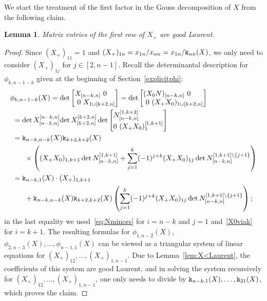 \documentclass{amsart}
\newtheorem{lemma}[theorem]{Lemma}
\theoremstyle{definition}
\theoremstyle{remark}
\numberwithin{equation}{section}
\numberwithin{theorem}{section}
\def\ek{{\tt k}}
\begin{document}
We start the treatment of the first factor in the Gauss decomposition of $X$ from the following claim.

\begin{lemma}
\label{lem:X+1Laurent}
Matrix entries of the first row of $X_+$ are  good Laurent.
\end{lemma}

\begin{proof} Since $(X_+)_{11}=1$ and $(X_+)_{1n}={x_{1n}}/{x_{nn}}={x_{1n}}/{\ek_{nn}(X)}$, we only need to consider 
$(X_+)_{1j}$ for $j\in[2, n-1]$. Recall the determinantal description for $\phi_{k,n-1-k}$ given 
at the beginning of Section~\ref{explicitphi}:
\begin{align*}
&\phi_{k,n-1-k}(X) =\det 
\begin{bmatrix*}[l]
X_{[n-k,n]}\ 0& \\
\ 0\ X_{1\cup [k+2,n]}\hspace{-1em}
\end{bmatrix*}
= \det 
\begin{bmatrix*}[l]
(X_0 N)_{[n-k,n]}\ 0& \\
\ 0\ (X_+X_0)_{1\cup [k+2,n]} \hspace{-1em}
\end{bmatrix*}\\
&\ = {\det X_{[n-k,n]}^{[n-k,n]} }{\det X_{[k+2,n]}^{[k+2,n]}} 
\det\begin{bmatrix*}[l]
N_{[n-k,n]}^{[1,k+2]} \\
0\ (X_+X_0)_{1}^{[1,k+1]}
\end{bmatrix*}\\
&\ ={\ek_{n-k,n-k}}(X){\ek_{k+2,k+2}}(X)\\
& \quad\quad\times \left (  (X_+X_0)_{1,k+1} \det N_{[n-k,n]}^{[1,k+1]} + \sum_{j=1}^k (-1)^{j+k}(X_+X_0)_{1j} \det N_{[n-k,n]}^{[1,k+1]\setminus \{j+1\}}\right )\\
&\ =\ek_{n-k,1}(X)\cdot(X_+)_{1,k+1}\\ &\quad\quad+{\ek_{n-k,n-k}}(X){\ek_{k+2,k+2}}(X)
  \left (\sum_{j=1}^k (-1)^{j+k}(X_+X_0)_{1j} \det N_{[n-k,n]}^{[1,k+1]\setminus \{j+1\}}\right );
\end{align*}
in the last equality we used~\eqref{eq:Nminors} for $i=n-k$ and $j=1$ and~\eqref{X0viak} for $i=k+1$. 
 The resulting formulas for $\phi_{1,n-2}(X)$, $\phi_{2,n-3}(X),\dots,\phi_{n-1,1}(X)$ can be viewed as a triangular system of linear equations for $(X_+)_{12},\ldots, (X_+)_{1,n-1}$. Due to Lemma~\ref{lem:X<Laurent}, the coefficients of this system  are good Laurent,  and in solving the system recursively for $(X_+)_{12},\ldots, (X_+)_{1,n-1}$, one only needs to divide by $\ek_{n-k,1}(X),\ldots,\ek_{21}(X)$, which proves the claim.
\end{proof}
\end{document}
